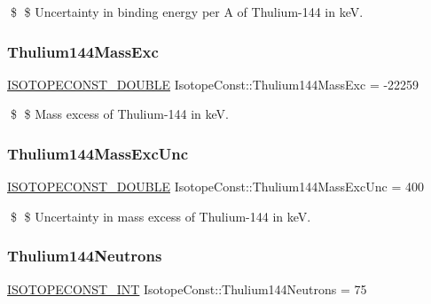 \$ \$ Uncertainty in binding energy per A of Thulium-\/144 in keV. \mbox{\label{group___isotope_const-_thulium-_tm144_ga8c7418e4785d37c449bcaed612ad6c4e}} 
\subsubsection{\texorpdfstring{Thulium144\+Mass\+Exc}{Thulium144MassExc}}
{\footnotesize\ttfamily \mbox{\hyperlink{group___isotope_const-_macros_ga8f45a7272ce02c0b4c65c44636ed719a}{I\+S\+O\+T\+O\+P\+E\+C\+O\+N\+S\+T\+\_\+\+D\+O\+U\+B\+LE}} Isotope\+Const\+::\+Thulium144\+Mass\+Exc = -\/22259}

\$ \$ Mass excess of Thulium-\/144 in keV. \mbox{\label{group___isotope_const-_thulium-_tm144_ga8153ed9a02a36bb1addcdc82c0505baf}} 
\subsubsection{\texorpdfstring{Thulium144\+Mass\+Exc\+Unc}{Thulium144MassExcUnc}}
{\footnotesize\ttfamily \mbox{\hyperlink{group___isotope_const-_macros_ga8f45a7272ce02c0b4c65c44636ed719a}{I\+S\+O\+T\+O\+P\+E\+C\+O\+N\+S\+T\+\_\+\+D\+O\+U\+B\+LE}} Isotope\+Const\+::\+Thulium144\+Mass\+Exc\+Unc = 400}

\$ \$ Uncertainty in mass excess of Thulium-\/144 in keV. \mbox{\label{group___isotope_const-_thulium-_tm144_gaa4848372bcfa1595e16911304bbe3dd4}} 
\subsubsection{\texorpdfstring{Thulium144\+Neutrons}{Thulium144Neutrons}}
{\footnotesize\ttfamily \mbox{\hyperlink{group___isotope_const-_macros_ga5f18360b3e99483a35c32d789e62621c}{I\+S\+O\+T\+O\+P\+E\+C\+O\+N\+S\+T\+\_\+\+I\+NT}} Isotope\+Const\+::\+Thulium144\+Neutrons = 75}

